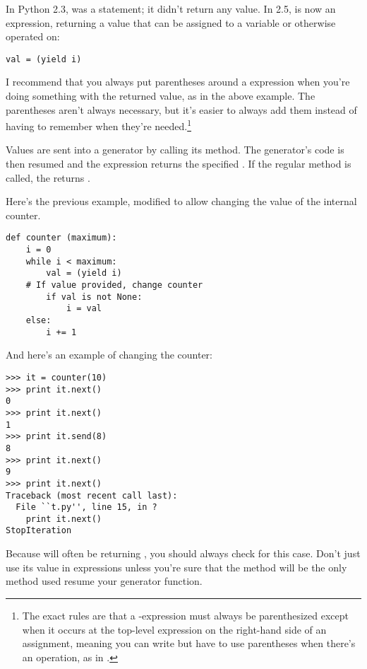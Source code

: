 \documentclass{howto}
\begin{document}
In Python 2.3,  was a statement; it didn't return any
value.  In 2.5,  is now an expression, returning a
value that can be assigned to a variable or otherwise operated on:

\begin{verbatim}
val = (yield i)
\end{verbatim}

I recommend that you always put parentheses around a 
expression when you're doing something with the returned value, as in
the above example.  The parentheses aren't always necessary, but it's
easier to always add them instead of having to remember when they're
needed.\footnote{The exact rules are that a -expression must
always be parenthesized except when it occurs at the top-level
expression on the right-hand side of an assignment, meaning you can
write  but have to use parentheses when there's an
operation, as in .}

Values are sent into a generator by calling its
 method.  The generator's code is then
resumed and the  expression returns the specified
.  If the regular  method is called, the
 returns .

Here's the previous example, modified to allow changing the value of
the internal counter.

\begin{verbatim}
def counter (maximum):
    i = 0
    while i < maximum:
        val = (yield i)
	# If value provided, change counter
        if val is not None:
            i = val
	else:
  	    i += 1
\end{verbatim}

And here's an example of changing the counter:

\begin{verbatim}
>>> it = counter(10)
>>> print it.next()
0
>>> print it.next()
1
>>> print it.send(8)
8
>>> print it.next()
9
>>> print it.next()
Traceback (most recent call last):
  File ``t.py'', line 15, in ?
    print it.next()
StopIteration
\end{verbatim}

Because  will often be returning , you
should always check for this case.  Don't just use its value in
expressions unless you're sure that the  method
will be the only method used resume your generator function.
\end{document}

